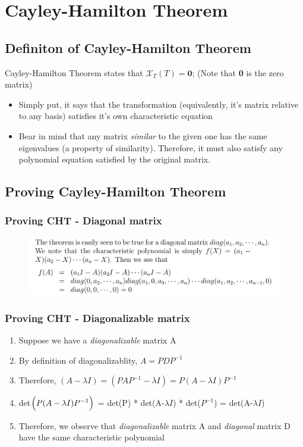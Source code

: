 \documentclass{article}
\begin{document}
\newpage
\section{Cayley-Hamilton Theorem}
\subsection{Definiton of Cayley-Hamilton Theorem}
Cayley-Hamilton Theorem states that $\mathcal{X}_{T}(T) = \textbf{0}$; (Note that \textbf{0} is the zero matrix)

\begin{itemize}
    \item Simply put, it says that the transformation (equivalently, it's matrix relative to any basis) satisfies it's own characteristic equation
    \item Bear in mind that any matrix \textit{similar} to the given one has the same eigenvalues (a property of similarity). Therefore, it must also satisfy any polynomial equation satisfied by the original matrix.
\end{itemize}

\subsection{Proving Cayley-Hamilton Theorem}
\subsubsection{Proving CHT - Diagonal matrix}
\begin{figure}[htp]
    \centering
    \includegraphics[width=15cm, scale=1]{S4/cayleyHamilton_diagonal.PNG}
\end{figure}

\subsubsection{Proving CHT - Diagonalizable matrix}
\begin{enumerate}
    \item Suppose we have a \textit{diagonalizable} matrix A
    \item By definition of diagonalizablity, $A = PDP^{-1}$
    \item Therefore, $(A-\lambda I) = (PAP^{-1} - \lambda I) = P(A-\lambda I)P^{-1}$
    \item det$\Bigl( P(A-\lambda I)P^{-1} \Bigr)$ = det(P) * det(A-$\lambda I$) * det($P^{-1}$) = det(A-$\lambda I$)
    \item Therefore, we observe that \textit{diagonalizable} matrix A and \textit{diagonal} matrix D have the same characteristic polynomial
\end{enumerate}
\end{document}
